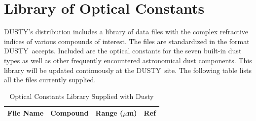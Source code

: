 \documentclass[11pt]{article}
\def\D    {{\sf DUSTY}}
\def\mic    {\hbox{$\mu$m}}
\begin{document}
\begin{appendix}
\begin{verbatim}
\end{verbatim}

\newpage

\section{Library of Optical Constants}
\label{nklib}

\D's distribution includes a library of data files with the complex
refractive indices of various compounds of interest.  The files are
standardized in the format \D\ accepts. Included are the optical
constants for the seven built-in dust types as well as other
frequently encountered astronomical dust components.  This library
will be updated continuously at the \D\ site. The following table
lists all the files currently supplied.

\begin{table}[h]
  \begin{center}

    \caption{\hfil Optical Constants Library Supplied with Dusty}
    \centerline{}

\begin{tabular}{llrr}
  \hline \hline
  \multicolumn{1}{c}{File Name}    &
  \multicolumn{1}{c}{Compound}     &
  \multicolumn{1}{c}{Range (\mic)} &
  \multicolumn{1}{c}{Ref}
  \\
  \hline


\end{tabular}
\end{center}
\end{table}
\end{appendix}
\end{document}
